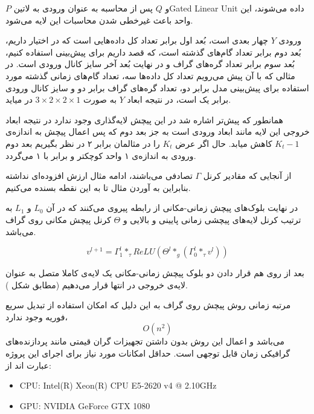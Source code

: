 \documentclass{article}
\begin{document}
 $P$ و $Q$ پس از محاسبه به عنوان ورودی به ‌لاتین{Gated Linear Unit} داده می‌شوند، این واحد باعث غیرخطی شدن محاسبات این لایه می‌شود.

ورودی $Y$ چهار بعدی است، بُعد اول برابر تعداد کل داده‌هایی است که در اختیار داریم، بُعد دوم برابر
تعداد گام‌های گذشته است، که قصد داریم برای پیش‌بینی استفاده کنیم،
بُعد سوم برابر تعداد گره‌های گراف و در نهایت بُعد آخر سایز کانال ورودی است.
در مثالی که با آن پیش می‌رویم تعداد کل داده‌ها سه، تعداد گام‌های زمانی گذشته مورد استفاده برای پیش‌بینی مدل برابر دو،
تعداد گره‌های گراف برابر دو و سایز کانال ورودی برابر یک است، در نتیجه ابعاد $Y$ به صورت $ 3 \times 2 \times 2 \times 1 $ در میاید.

همانطور که پیش‌تر اشاره شد در این پیچش لایه‌گذاری وجود ندارد در نتیجه ابعاد خروجی این لایه مانند ابعاد ورودی است به جز بعد دوم
که پس اعمال پیچش به اندازه‌ی $K_{t}-1$ کاهش میابد. حال اگر عرض $K_{t}$ را در مثالمان برابر ۲ در نظر بگیریم
بعد دوم ورودی به اندازه‌ی ۱ واحد کوچکتر و برابر با ۱ می‌گردد.

از آنجایی که مقادیر کرنل $\Gamma$ تصادفی می‌باشند، ادامه مثال ارزش افزوده‌ای نداشته بنابراین به آوردن مثال تا به این نقطه بسنده می‌کنیم.

در نهایت بلوک‌های پیچش زمانی-مکانی از رابطه  پیروی می‌کنند که در آن $L_{0}$ و $L_{1}$ به ترتیب کرنل‌ لایه‌های پیچشی زمانی پایینی و بالایی و $\Theta$ کرنل پیچش مکانی روی گراف می‌باشد.

\begin{equation}
v^{{l+1}} = \Gamma^{l}_{1} *_{\tau} ReLU( \Theta^{l} *_{g} (\Gamma_{0}^{l} *_{\tau} v^{l}) )
  \label{eq:blocks}
\end{equation}

بعد از روی هم قرار دادن دو بلوک پیچش زمانی-مکانی یک لایه‌ی کاملا متصل به عنوان لایه‌ی خروجی در انتها قرار می‌دهیم (مطابق شکل ).

مرتبه زمانی روش پیچش روی گراف به این دلیل که امکان استفاده از تبدیل سریع فوریه وجود ندارد،
\[
O(n^{2})
\]
می‌باشد و اعمال این روش بدون داشتن تجهیزات گران قیمتی مانند پردازنده‌های گرافیکی زمان قابل توجهی است. حداقل امکانات مورد نیاز برای اجرای این پروژه عبارت اند از:

\begin{latin}\begin{itemize}
\item CPU: Intel(R) Xeon(R) CPU E5-2620 v4 @ 2.10GHz
\item GPU: NVIDIA GeForce GTX 1080
\end{itemize}\end{latin}
\end{document}
